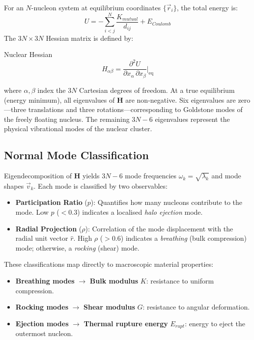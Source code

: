 For an $N$-nucleon system at equilibrium coordinates $\{\vec{r}_i\}$, the total energy is:
\begin{equation}
    U = -\sum_{i<j}^{N} \frac{K_{mutual}}{d_{ij}} + E_{Coulomb}
\end{equation}
The $3N \times 3N$ Hessian matrix is defined by:
\begin{resultbox}{Nuclear Hessian}
\begin{equation}
    H_{\alpha\beta} = \frac{\partial^2 U}{\partial x_\alpha \, \partial x_\beta}\bigg|_{\text{eq}}
    \label{eq:hessian}
\end{equation}
\end{resultbox}
\noindent where $\alpha, \beta$ index the $3N$ Cartesian degrees of freedom. At a true equilibrium (energy minimum), all eigenvalues of $\mathbf{H}$ are non-negative. Six eigenvalues are zero---three translations and three rotations---corresponding to Goldstone modes of the freely floating nucleus. The remaining $3N - 6$ eigenvalues represent the physical vibrational modes of the nuclear cluster.

\subsection{Normal Mode Classification}

Eigendecomposition of $\mathbf{H}$ yields $3N-6$ mode frequencies $\omega_k = \sqrt{\lambda_k}$ and mode shapes $\vec{v}_k$. Each mode is classified by two observables:
\begin{itemize}
    \item \textbf{Participation Ratio} ($p$): Quantifies how many nucleons contribute to the mode. Low $p$ ($<0.3$) indicates a localised \textit{halo ejection} mode.
    \item \textbf{Radial Projection} ($\rho$): Correlation of the mode displacement with the radial unit vector $\hat{r}$. High $\rho$ ($>0.6$) indicates a \textit{breathing} (bulk compression) mode; otherwise, a \textit{rocking} (shear) mode.
\end{itemize}

These classifications map directly to macroscopic material properties:
\begin{itemize}
    \item \textbf{Breathing modes} $\to$ \textbf{Bulk modulus} $K$: resistance to uniform compression.
    \item \textbf{Rocking modes} $\to$ \textbf{Shear modulus} $G$: resistance to angular deformation.
    \item \textbf{Ejection modes} $\to$ \textbf{Thermal rupture energy} $E_{rupt}$: energy to eject the outermost nucleon.
\end{itemize}

